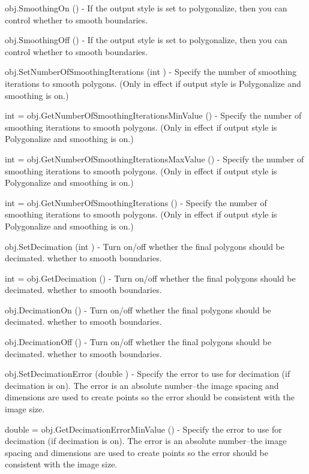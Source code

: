 \begin{DoxyItemize}
\item {\ttfamily obj.\-Smoothing\-On ()} -\/ If the output style is set to polygonalize, then you can control whether to smooth boundaries.  
\item {\ttfamily obj.\-Smoothing\-Off ()} -\/ If the output style is set to polygonalize, then you can control whether to smooth boundaries.  
\item {\ttfamily obj.\-Set\-Number\-Of\-Smoothing\-Iterations (int )} -\/ Specify the number of smoothing iterations to smooth polygons. (Only in effect if output style is Polygonalize and smoothing is on.)  
\item {\ttfamily int = obj.\-Get\-Number\-Of\-Smoothing\-Iterations\-Min\-Value ()} -\/ Specify the number of smoothing iterations to smooth polygons. (Only in effect if output style is Polygonalize and smoothing is on.)  
\item {\ttfamily int = obj.\-Get\-Number\-Of\-Smoothing\-Iterations\-Max\-Value ()} -\/ Specify the number of smoothing iterations to smooth polygons. (Only in effect if output style is Polygonalize and smoothing is on.)  
\item {\ttfamily int = obj.\-Get\-Number\-Of\-Smoothing\-Iterations ()} -\/ Specify the number of smoothing iterations to smooth polygons. (Only in effect if output style is Polygonalize and smoothing is on.)  
\item {\ttfamily obj.\-Set\-Decimation (int )} -\/ Turn on/off whether the final polygons should be decimated. whether to smooth boundaries.  
\item {\ttfamily int = obj.\-Get\-Decimation ()} -\/ Turn on/off whether the final polygons should be decimated. whether to smooth boundaries.  
\item {\ttfamily obj.\-Decimation\-On ()} -\/ Turn on/off whether the final polygons should be decimated. whether to smooth boundaries.  
\item {\ttfamily obj.\-Decimation\-Off ()} -\/ Turn on/off whether the final polygons should be decimated. whether to smooth boundaries.  
\item {\ttfamily obj.\-Set\-Decimation\-Error (double )} -\/ Specify the error to use for decimation (if decimation is on). The error is an absolute number--the image spacing and dimensions are used to create points so the error should be consistent with the image size.  
\item {\ttfamily double = obj.\-Get\-Decimation\-Error\-Min\-Value ()} -\/ Specify the error to use for decimation (if decimation is on). The error is an absolute number--the image spacing and dimensions are used to create points so the error should be consistent with the image size.  

\end{DoxyItemize}
